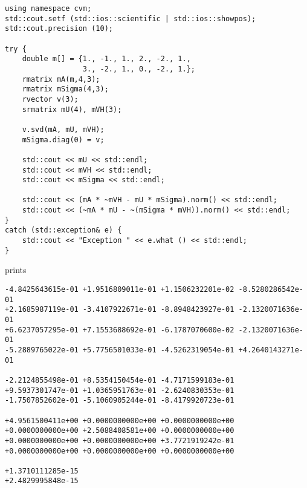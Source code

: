 \begin{Verbatim}
using namespace cvm;
std::cout.setf (std::ios::scientific | std::ios::showpos);
std::cout.precision (10);

try {
    double m[] = {1., -1., 1., 2., -2., 1.,
                  3., -2., 1., 0., -2., 1.};
    rmatrix mA(m,4,3);
    rmatrix mSigma(4,3);
    rvector v(3);
    srmatrix mU(4), mVH(3);

    v.svd(mA, mU, mVH);
    mSigma.diag(0) = v;

    std::cout << mU << std::endl;
    std::cout << mVH << std::endl;
    std::cout << mSigma << std::endl;

    std::cout << (mA * ~mVH - mU * mSigma).norm() << std::endl;
    std::cout << (~mA * mU - ~(mSigma * mVH)).norm() << std::endl;
}
catch (std::exception& e) {
    std::cout << "Exception " << e.what () << std::endl;
}
\end{Verbatim}
prints
\begin{Verbatim}
-4.8425643615e-01 +1.9516809011e-01 +1.1506232201e-02 -8.5280286542e-01
+2.1685987119e-01 -3.4107922671e-01 -8.8948423927e-01 -2.1320071636e-01
+6.6237057295e-01 +7.1553688692e-01 -6.1787070600e-02 -2.1320071636e-01
-5.2889765022e-01 +5.7756501033e-01 -4.5262319054e-01 +4.2640143271e-01

-2.2124855498e-01 +8.5354150454e-01 -4.7171599183e-01
+9.5937301747e-01 +1.0365951763e-01 -2.6240830353e-01
-1.7507852602e-01 -5.1060905244e-01 -8.4179920723e-01

+4.9561500411e+00 +0.0000000000e+00 +0.0000000000e+00
+0.0000000000e+00 +2.5088408581e+00 +0.0000000000e+00
+0.0000000000e+00 +0.0000000000e+00 +3.7721919242e-01
+0.0000000000e+00 +0.0000000000e+00 +0.0000000000e+00

+1.3710111285e-15
+2.4829995848e-15
\end{Verbatim}
\newpage


